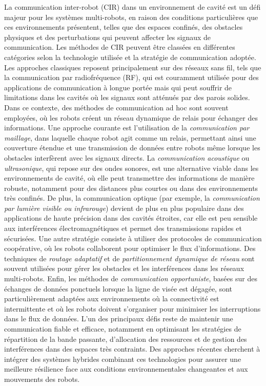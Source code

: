 \documentclass[main.tex]{subfiles}
\begin{document}
La communication inter-robot (CIR) dans un environnement de cavité est un défi majeur pour les systèmes multi-robots, en raison des conditions particulières que ces environnements présentent, telles que des espaces confinés, des obstacles physiques et des perturbations qui peuvent affecter les signaux de communication. Les méthodes de CIR peuvent être classées en différentes catégories selon la technologie utilisée et la stratégie de communication adoptée. Les approches classiques reposent principalement sur des réseaux sans fil, tels que la communication par radiofréquence (RF), qui est couramment utilisée pour des applications de communication à longue portée mais qui peut souffrir de limitations dans les cavités où les signaux sont atténués par des parois solides. Dans ce contexte, des méthodes de communication ad hoc sont souvent employées, où les robots créent un réseau dynamique de relais pour échanger des informations. Une approche courante est l'utilisation de la \textit{communication par maillage}, dans laquelle chaque robot agit comme un relais, permettant ainsi une couverture étendue et une transmission de données entre robots même lorsque les obstacles interfèrent avec les signaux directs. La \textit{communication acoustique} ou \textit{ultrasonique}, qui repose sur des ondes sonores, est une alternative viable dans les environnements de cavité, où elle peut transmettre des informations de manière robuste, notamment pour des distances plus courtes ou dans des environnements très confinés. De plus, la communication optique (par exemple, la \textit{communication par lumière visible ou infrarouge}) devient de plus en plus populaire dans des applications de haute précision dans des cavités étroites, car elle est peu sensible aux interférences électromagnétiques et permet des transmissions rapides et sécurisées. Une autre stratégie consiste à utiliser des protocoles de communication coopérative, où les robots collaborent pour optimiser le flux d'informations. Des techniques de \textit{routage adaptatif} et de \textit{partitionnement dynamique de réseau} sont souvent utilisées pour gérer les obstacles et les interférences dans les réseaux multi-robots. Enfin, les méthodes de \textit{communication opportuniste}, basées sur des échanges de données ponctuels lorsque la ligne de visée est dégagée, sont particulièrement adaptées aux environnements où la connectivité est intermittente et où les robots doivent s'organiser pour minimiser les interruptions dans le flux de données. L'un des principaux défis reste de maintenir une communication fiable et efficace, notamment en optimisant les stratégies de répartition de la bande passante, d'allocation des ressources et de gestion des interférences dans des espaces très contraints. Des approches récentes cherchent à intégrer des systèmes hybrides combinant ces technologies pour assurer une meilleure résilience face aux conditions environnementales changeantes et aux mouvements des robots. 
\end{document}

